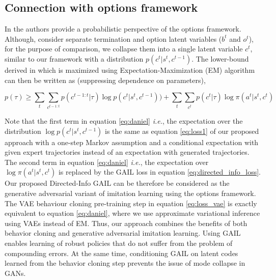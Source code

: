 \documentclass{article} %
\begin{document}
\subsection{Connection with options framework}

In \cite{daniel2016probabilistic} the authors provide a probabilistic perspective of the options framework. Although, \cite{daniel2016probabilistic} consider separate termination and option latent variables ($b^t$ and $o^t$), for the purpose of comparison, we collapse them into a single latent variable $c^t$, similar to our framework with a distribution $p(c^t|s^t, c^{t-1})$. The lower-bound derived in \cite{daniel2016probabilistic} which is maximized using Expectation-Maximization (EM) algorithm can then be written as (suppressing dependence on parameters),

\begin{equation}
    p(\tau) \geq \sum_{t} \sum_{c^{t-1:t}} p(c^{t-1:t}|\tau) \log p(c^t|s^t, c^{t-1})) 
    + \sum_{t} \sum_{c^t} p(c^t|\tau) \log \pi(a^t|s^t, c^t)
\label{eq:daniel}
\end{equation}

Note that the first term in equation \ref{eq:daniel} \emph{i.e.}, the expectation over the distribution $\log p(c^t|s^t, c^{t-1})$ is the same as equation \ref{eq:loss1} of our proposed approach with a one-step Markov assumption and a conditional expectation with given expert trajectories instead of an expectation with generated trajectories. The second term in equation \ref{eq:daniel} \emph{i.e.}, the expectation over $\log \pi(a^t|s^t, c^t)$ is replaced by the GAIL loss in equation \ref{eq:directed_info_loss}. Our proposed Directed-Info GAIL can be therefore be considered as the generative adversarial variant of imitation learning using the options framework. The VAE behaviour cloning pre-training step in equation \ref{eq:loss_vae} is exactly equivalent to equation \ref{eq:daniel}, where we use approximate variational inference using VAEs instead of EM. Thus, our approach combines the benefits of both behavior cloning and generative adversarial imitation learning. Using GAIL enables learning of robust policies that do not suffer from the problem of compounding errors. At the same time, conditioning GAIL on latent codes learned from the behavior cloning step prevents the issue of mode collapse in GANs.
\end{document}
